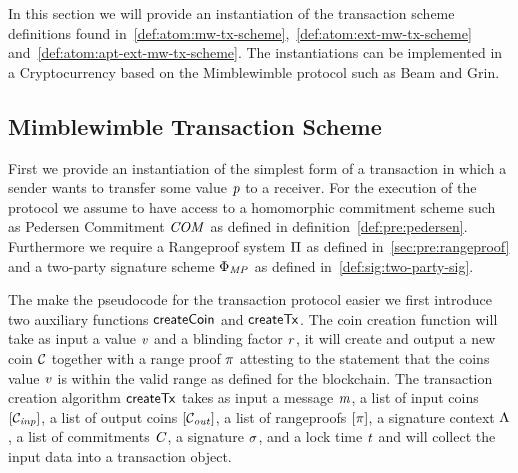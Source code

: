 In this section we will provide an instantiation of the transaction scheme definitions found in~\ref{def:atom:mw-tx-scheme},~\ref{def:atom:ext-mw-tx-scheme} and~\ref{def:atom:apt-ext-mw-tx-scheme}. The instantiations can be implemented in a Cryptocurrency based on the Mimblewimble protocol such as Beam and Grin.

\subsection{Mimblewimble Transaction Scheme}

First we provide an instantiation of the simplest form of a transaction in which a sender wants to transfer some value $\mathit{p}$ to a receiver.
For the execution of the protocol we assume to have access to a homomorphic commitment scheme such as Pedersen Commitment $\mathit{COM}$ as defined in definition~\ref{def:pre:pedersen}.
Furthermore we require a Rangeproof system $\Pi$ as defined in~\ref{sec:pre:rangeproof} and a two-party signature scheme $\Phi_{\mathit{MP}}$ as defined in~\ref{def:sig:two-party-sig}.

The make the pseudocode for the transaction protocol easier we first introduce two auxiliary functions $\mathsf{createCoin}$
and $\mathsf{createTx}$. The coin creation function will take as input a value $\mathit{v}$ and a blinding factor $\mathit{r}$, it will create and output a new coin $\mathcal{C}$ together with a range proof
$\pi$ attesting to the statement that the coins value $\mathit{v}$ is within the valid range as defined for the blockchain.
The transaction creation algorithm $\mathsf{createTx}$ takes as input a message $\mathit{m}$, a list of input coins $[\mathcal{C}_{\mathit{inp}}]$, a list of output coins $[\mathcal{C}_{\mathit{out}}]$, a list of rangeproofs
$[\pi]$, a signature context $\Lambda$, a list of commitments $\mathit{C}$, a signature $\sigma$, and a lock time $\mathit{t}$ and will collect the input data into a transaction object.

